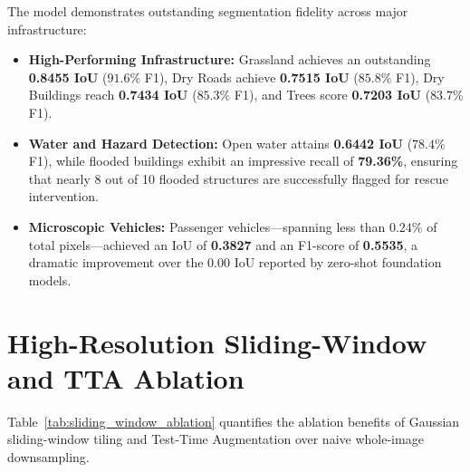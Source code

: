 The model demonstrates outstanding segmentation fidelity across major infrastructure:
\begin{itemize}
    \item \textbf{High-Performing Infrastructure:} Grassland achieves an outstanding \textbf{0.8455 IoU} ($91.6\%$ F1), Dry Roads achieve \textbf{0.7515 IoU} ($85.8\%$ F1), Dry Buildings reach \textbf{0.7434 IoU} ($85.3\%$ F1), and Trees score \textbf{0.7203 IoU} ($83.7\%$ F1).
    \item \textbf{Water and Hazard Detection:} Open water attains \textbf{0.6442 IoU} ($78.4\%$ F1), while flooded buildings exhibit an impressive recall of \textbf{79.36\%}, ensuring that nearly 8 out of 10 flooded structures are successfully flagged for rescue intervention.
    \item \textbf{Microscopic Vehicles:} Passenger vehicles—spanning less than $0.24\%$ of total pixels—achieved an IoU of \textbf{0.3827} and an F1-score of \textbf{0.5535}, a dramatic improvement over the $0.00$ IoU reported by zero-shot foundation models.
\end{itemize}

\section{High-Resolution Sliding-Window and TTA Ablation}
Table~\ref{tab:sliding_window_ablation} quantifies the ablation benefits of Gaussian sliding-window tiling and Test-Time Augmentation over naive whole-image downsampling.

\begin{table}[htbp]
\centering
\small
\caption{Ablation Study: Impact of Input Resolution, Gaussian Feathering, and TTA on Fine-Scale Segmentation.}
\label{tab:sliding_window_ablation}
\end{table}

